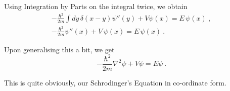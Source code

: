 Using Integration by Parts on the integral twice, we obtain 
    \begin{gather}
        - \frac{\hbar^2}{2m} \int dy \, \delta(x-y) \psi''(y) + V \psi(x) = E\,  \psi(x)~,        
        \\
        - \frac{\hbar^2}{2m} \psi''(x) + V\, \psi(x) = E\,  \psi(x)~.        
    \end{gather}

Upon generalising this a bit, we get
    \begin{equation}
        - \frac{\hbar^2}{2m} \nabla^2 \psi + V \psi = E \psi~.        
    \end{equation}

This is quite obviously, our Schrodinger's Equation in co-ordinate form.
